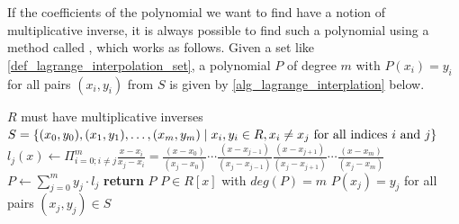 If the coefficients of the polynomial we want to find have a notion of multiplicative inverse, it is always possible to find such a polynomial using a method called , which works as follows. Given a set like \ref{def_lagrange_interpolation_set}, a polynomial $P$ of degree $m$ with $P(x_i)=y_i$ for all pairs $(x_i,y_i)$ from $S$ is given by \algname{} \ref{alg_lagrange_interplation} below.

\begin{algorithm}\caption{Lagrange Interpolation}
\label{alg_lagrange_interplation}
\begin{algorithmic}[0]
\Require $R$ must have multiplicative inverses
\Require $S= \{(x_0,y_0), (x_1,y_1),\ldots,(x_m,y_m)\;|\; x_i,y_i\in R, x_i\neq x_j\text{ for all indices $ i $ and $ j $}\}$
\State  $l_j(x) \gets \Pi_{i=0;i\neq j}^{m}\frac{x-x_i}{x_j-x_i} = \frac{(x-x_0)}{(x_j-x_0)} \cdots \frac{(x-x_{j-1})}{(x_j-x_{j - 1})} \frac{(x-x_{j+1})}{(x_j-x_{j+1})} \cdots \frac{(x-x_m)}{(x_j-x_m)}$
\EndFor
\State $P\gets \sum_{j=0}^m y_j\cdot l_j$
\State \textbf{return} $P$
\EndProcedure
\Ensure $P\in R[x]$ with $deg(P)=m$
\Ensure $P(x_j)=y_j$ for all pairs $(x_j,y_j)\in S$
\end{algorithmic}
\end{algorithm}

